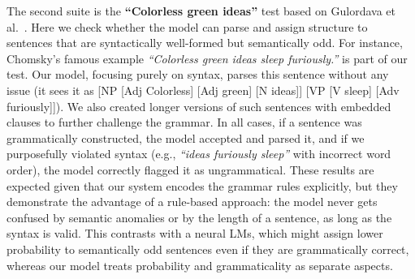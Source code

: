 \documentclass[11pt]{article}
\begin{document}
The second suite is the \textbf{\textquotedblleft Colorless green ideas\textquotedblright} test based on Gulordava et al.~\cite{gulordava2018}. Here we check whether the model can parse and assign structure to sentences that are syntactically well-formed but semantically odd. For instance, Chomsky's famous example \textit{\textquotedblleft Colorless green ideas sleep furiously.\textquotedblright} is part of our test. Our model, focusing purely on syntax, parses this sentence without any issue (it sees it as [NP [Adj Colorless] [Adj green] [N ideas]] [VP [V sleep] [Adv furiously]]). We also created longer versions of such sentences with embedded clauses to further challenge the grammar. In all cases, if a sentence was grammatically constructed, the model accepted and parsed it, and if we purposefully violated syntax (e.g., \textit{\textquotedblleft ideas furiously sleep\textquotedblright} with incorrect word order), the model correctly flagged it as ungrammatical. These results are expected given that our system encodes the grammar rules explicitly, but they demonstrate the advantage of a rule-based approach: the model never gets confused by semantic anomalies or by the length of a sentence, as long as the syntax is valid. This contrasts with a neural LMs, which might assign lower probability to semantically odd sentences even if they are grammatically correct, whereas our model treats probability and grammaticality as separate aspects.
\end{document}
